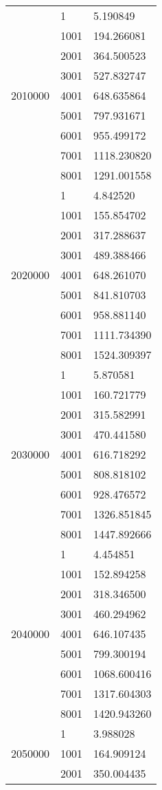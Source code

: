 \begin{table}[htb!]
\begin{tabular}{lll}
\multirow[c]{9}{*}{2010000} & 1 & 5.190849 \\
 & 1001 & 194.266081 \\
 & 2001 & 364.500523 \\
 & 3001 & 527.832747 \\
 & 4001 & 648.635864 \\
 & 5001 & 797.931671 \\
 & 6001 & 955.499172 \\
 & 7001 & 1118.230820 \\
 & 8001 & 1291.001558 \\
\multirow[c]{9}{*}{2020000} & 1 & 4.842520 \\
 & 1001 & 155.854702 \\
 & 2001 & 317.288637 \\
 & 3001 & 489.388466 \\
 & 4001 & 648.261070 \\
 & 5001 & 841.810703 \\
 & 6001 & 958.881140 \\
 & 7001 & 1111.734390 \\
 & 8001 & 1524.309397 \\
\multirow[c]{9}{*}{2030000} & 1 & 5.870581 \\
 & 1001 & 160.721779 \\
 & 2001 & 315.582991 \\
 & 3001 & 470.441580 \\
 & 4001 & 616.718292 \\
 & 5001 & 808.818102 \\
 & 6001 & 928.476572 \\
 & 7001 & 1326.851845 \\
 & 8001 & 1447.892666 \\
\multirow[c]{9}{*}{2040000} & 1 & 4.454851 \\
 & 1001 & 152.894258 \\
 & 2001 & 318.346500 \\
 & 3001 & 460.294962 \\
 & 4001 & 646.107435 \\
 & 5001 & 799.300194 \\
 & 6001 & 1068.600416 \\
 & 7001 & 1317.604303 \\
 & 8001 & 1420.943260 \\
\multirow[c]{9}{*}{2050000} & 1 & 3.988028 \\
 & 1001 & 164.909124 \\
 & 2001 & 350.004435 \\

\end{tabular}
\end{table}
